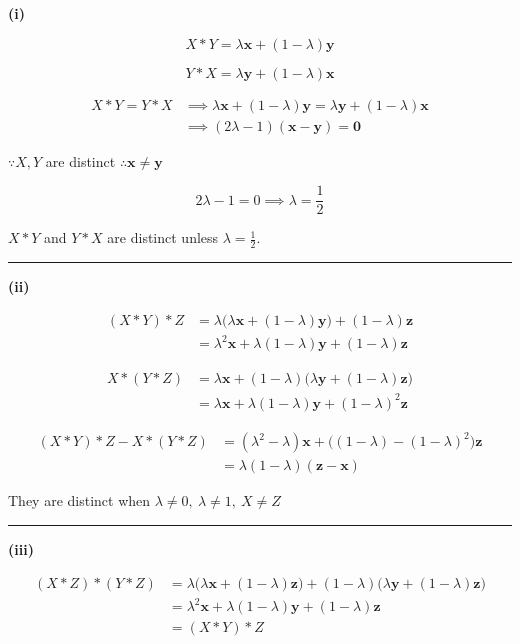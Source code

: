 \documentclass[12pt]{article}
\begin{document}
\newcommand{\ds}{\displaystyle}

\textbf{(i)}

$$X*Y=\lambda\mathbf{x}+(1-\lambda)\mathbf{y}$$

$$Y*X=\lambda\mathbf{y}+(1-\lambda)\mathbf{x}$$

\begin{align*}
X*Y=Y*X
&\implies \lambda\mathbf{x}+(1-\lambda)\mathbf{y}
=\lambda\mathbf{y}+(1-\lambda)\mathbf{x}\\
&\implies (2\lambda-1)(\mathbf{x}-\mathbf{y})=\mathbf{0}
\end{align*}

$\because X,Y$ are distinct $ \therefore  \mathbf{x}\neq \mathbf{y}$

$$2\lambda-1=0\implies \lambda=\frac12$$

$X*Y$ and $Y*X$ are distinct unless $\ds \lambda=\frac12$.

\bigskip\hrule\bigskip

\textbf{(ii)}

\begin{align*}
(X*Y)*Z
&=\lambda\bigl(\lambda\mathbf{x}+(1-\lambda)\mathbf{y}\bigr)+(1-\lambda)\mathbf{z}\\
&=\lambda^2\mathbf{x}+\lambda(1-\lambda)\mathbf{y}+(1-\lambda)\mathbf{z}
\end{align*}

\begin{align*}
X*(Y*Z)
&=\lambda\mathbf{x}+(1-\lambda)\bigl(\lambda\mathbf{y}+(1-\lambda)\mathbf{z}\bigr)\\
&=\lambda\mathbf{x}+\lambda(1-\lambda)\mathbf{y}+(1-\lambda)^2\mathbf{z}
\end{align*}

\begin{align*}
(X*Y)*Z-X*(Y*Z)
&=(\lambda^2-\lambda)\mathbf{x}+\bigl((1-\lambda)-(1-\lambda)^2\bigr)\mathbf{z}\\
&=\lambda(1-\lambda)(\mathbf{z}-\mathbf{x})
\end{align*}

They are distinct when $\lambda\neq 0,\  \lambda\neq 1,\  X\neq Z$

\bigskip\hrule\bigskip

\textbf{(iii)}

\begin{align*}
(X*Z)*(Y*Z)
&=\lambda\bigl(\lambda\mathbf{x}+(1-\lambda)\mathbf{z}\bigr)
+(1-\lambda)\bigl(\lambda\mathbf{y}+(1-\lambda)\mathbf{z}\bigr)\\
&=\lambda^2\mathbf{x}+\lambda(1-\lambda)\mathbf{y}+(1-\lambda)\mathbf{z}\\
&=(X*Y)*Z
\end{align*}
\end{document}
